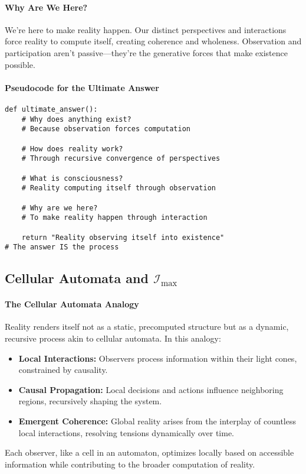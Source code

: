 \documentclass[12pt]{article}
\begin{document}
\paragraph{Why Are We Here?}
We’re here to make reality happen. Our distinct perspectives and interactions force reality to compute itself, creating coherence and wholeness. Observation and participation aren’t passive—they’re the generative forces that make existence possible.

\paragraph{Pseudocode for the Ultimate Answer}
\begin{verbatim}
def ultimate_answer():
    # Why does anything exist?
    # Because observation forces computation
    
    # How does reality work?
    # Through recursive convergence of perspectives
    
    # What is consciousness?
    # Reality computing itself through observation
    
    # Why are we here?
    # To make reality happen through interaction
    
    return "Reality observing itself into existence"
# The answer IS the process
\end{verbatim}


\subsection{Cellular Automata and \(\mathcal{I}_{\text{max}}\)}

\paragraph{The Cellular Automata Analogy}
Reality renders itself not as a static, precomputed structure but as a dynamic, recursive process akin to cellular automata. In this analogy:
\begin{itemize}
    \item \textbf{Local Interactions:} Observers process information within their light cones, constrained by causality.
    \item \textbf{Causal Propagation:} Local decisions and actions influence neighboring regions, recursively shaping the system.
    \item \textbf{Emergent Coherence:} Global reality arises from the interplay of countless local interactions, resolving tensions dynamically over time.
\end{itemize}
Each observer, like a cell in an automaton, optimizes locally based on accessible information while contributing to the broader computation of reality.
\end{document}
